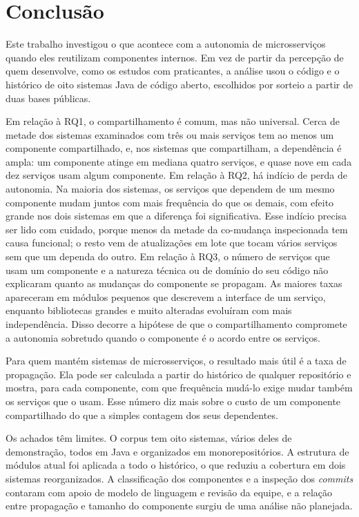 \chapter{Conclusão}
\label{cap:conclusao}

Este trabalho investigou o que acontece com a autonomia de microsserviços quando eles reutilizam componentes internos. Em vez de partir da percepção de quem desenvolve, como os estudos com praticantes, a análise usou o código e o histórico de oito sistemas Java de código aberto, escolhidos por sorteio a partir de duas bases públicas.

Em relação à RQ1, o compartilhamento é comum, mas não universal. Cerca de metade dos sistemas examinados com três ou mais serviços tem ao menos um componente compartilhado, e, nos sistemas que compartilham, a dependência é ampla: um componente atinge em mediana quatro serviços, e quase nove em cada dez serviços usam algum componente. Em relação à RQ2, há indício de perda de autonomia. Na maioria dos sistemas, os serviços que dependem de um mesmo componente mudam juntos com mais frequência do que os demais, com efeito grande nos dois sistemas em que a diferença foi significativa. Esse indício precisa ser lido com cuidado, porque menos da metade da co-mudança inspecionada tem causa funcional; o resto vem de atualizações em lote que tocam vários serviços sem que um dependa do outro. Em relação à RQ3, o número de serviços que usam um componente e a natureza técnica ou de domínio do seu código não explicaram quanto as mudanças do componente se propagam. As maiores taxas apareceram em módulos pequenos que descrevem a interface de um serviço, enquanto bibliotecas grandes e muito alteradas evoluíram com mais independência. Disso decorre a hipótese de que o compartilhamento compromete a autonomia sobretudo quando o componente é o acordo entre os serviços.

Para quem mantém sistemas de microsserviços, o resultado mais útil é a taxa de propagação. Ela pode ser calculada a partir do histórico de qualquer repositório e mostra, para cada componente, com que frequência mudá-lo exige mudar também os serviços que o usam. Esse número diz mais sobre o custo de um componente compartilhado do que a simples contagem dos seus dependentes.

Os achados têm limites. O corpus tem oito sistemas, vários deles de demonstração, todos em Java e organizados em monorepositórios. A estrutura de módulos atual foi aplicada a todo o histórico, o que reduziu a cobertura em dois sistemas reorganizados. A classificação dos componentes e a inspeção dos \textit{commits} contaram com apoio de modelo de linguagem e revisão da equipe, e a relação entre propagação e tamanho do componente surgiu de uma análise não planejada.

